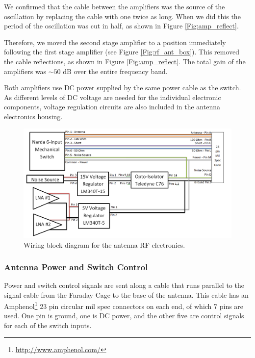 We confirmed that the cable between the amplifiers was the source of the oscillation by replacing the cable with one twice as long. When we did this the period of the oscillation was cut in half, as shown in Figure \ref{Fig:amp_reflect}. 

Therefore, we moved the second stage amplifier to a position immediately following the first stage amplifier (see Figure \ref{Fig:rf_ant_box}). This removed the cable reflections, as shown in Figure \ref{Fig:amp_reflect}. The total gain of the amplifiers was $\sim 50$ dB over the entire frequency band. 

Both amplifiers use DC power supplied by the same power cable as the switch. As different levels of DC voltage are needed for the individual electronic components, voltage regulation circuits are also included in the antenna electronics housing. 

\begin{figure}[htb]
\begin{center}
\includegraphics[width=0.9\linewidth]{SCIHI_system/figures/antenna_rf_power_block_diagram.png}
\caption{Wiring block diagram for the antenna RF electronics.}
\label{Fig:ant_RF_pow_block_diagram}
\end{center}
\end{figure}

\subsubsection{Antenna Power and Switch Control} \label{Sec:ant_pow}

Power and switch control signals are sent along a cable that runs parallel to the signal cable from the Faraday Cage to the base of the antenna. This cable has an Amphenol\footnote{\url{http://www.amphenol.com/}} 23 pin circular mil spec connectors on each end, of which 7 pins are used. One pin is ground, one is DC power, and the other five are control signals for each of the switch inputs. 

